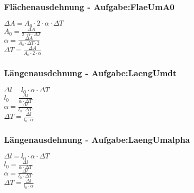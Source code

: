 \subsubsection{Flächenausdehnung - Aufgabe:FlaeUmA0} 
\begin{minipage}{0.45\textwidth} 
$ \Delta A = A_{0} \cdot 2\cdot \alpha \cdot \Delta T $\\ 
$ A_{0}  = \frac{ \Delta A}{2\cdot \alpha \cdot \Delta T} $\\ 
$ \alpha  = \frac{ \Delta A}{A_{0} \cdot \Delta T\cdot 2} $\\ 
$ \Delta T = \frac{ \Delta A}{A_{0} \cdot 2\cdot \alpha } $\\ 
\end{minipage} 
\begin{minipage}{0.45\textwidth} 
 
\end{minipage} 
\subsubsection{Längenausdehnung - Aufgabe:LaengUmdt} 
\begin{minipage}{0.45\textwidth} 
$ \Delta l = l_{0} \cdot \alpha \cdot \Delta T $\\ 
$ l_{0}  = \frac{ \Delta l}{\alpha \cdot \Delta T} $\\ 
$ \alpha  = \frac{ \Delta l}{l_{0} \cdot \Delta T} $\\ 
$ \Delta T = \frac{ \Delta l}{l_{0} \cdot \alpha } $\\ 
\end{minipage} 
\begin{minipage}{0.45\textwidth} 
 
\end{minipage} 
\subsubsection{Längenausdehnung - Aufgabe:LaengUmalpha} 
\begin{minipage}{0.45\textwidth} 
$ \Delta l = l_{0} \cdot \alpha \cdot \Delta T $\\ 
$ l_{0}  = \frac{ \Delta l}{\alpha \cdot \Delta T} $\\ 
$ \alpha  = \frac{ \Delta l}{l_{0} \cdot \Delta T} $\\ 
$ \Delta T = \frac{ \Delta l}{l_{0} \cdot \alpha } $\\ 
\end{minipage} 
\begin{minipage}{0.45\textwidth} 
 
\end{minipage} 
